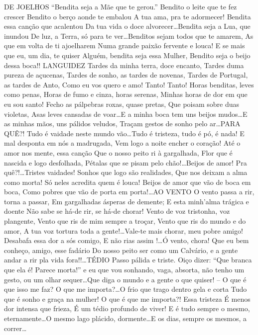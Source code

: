 DE JOELHOS “Bendita seja a Mãe que te gerou.” Bendito o leite que te fez crescer 
Bendito o berço aonde te embalou A tua ama, pra te adormecer! Bendita essa canção que acalentou Da tua vida o doce alvorecer\ldots Bendita seja a Lua, que inundou De luz, a Terra, só para te ver\ldots Benditos sejam todos que te amarem, As que em volta de ti ajoelharem Numa grande paixão fervente e louca! E se mais que eu, um dia, te quiser Alguém, bendita seja essa Mulher, Bendito seja o beijo dessa boca!! LANGUIDEZ Tardes da minha terra, doce encanto, Tardes duma pureza de açucenas, Tardes de sonho, as tardes de novenas, Tardes de Portugal, as tardes de Anto, Como eu vos quero e amo! Tanto! Tanto! Horas benditas, leves como penas, Horas de fumo e cinza, horas serenas, Minhas horas de dor em que eu sou santo! Fecho as pálpebras roxas, quase pretas, Que poisam sobre duas violetas, Asas leves cansadas de voar\ldots E a minha boca tem uns beijos mudos\ldots E as minhas mãos, uns pálidos veludos, Traçam gestos de sonho pelo ar\ldots PARA QUÊ?! Tudo é vaidade neste mundo vão\ldots Tudo é tristeza, tudo é pó, é nada! E mal desponta em nós a madrugada, Vem logo a noite encher o coração! Até o amor nos mente, essa canção Que o nosso peito ri à gargalhada, Flor que é nascida e logo desfolhada, Pétalas que se pisam pelo chão!\ldots Beijos de amor! Pra quê?!\ldots Tristes vaidades! Sonhos que logo são realidades, Que nos deixam a alma como morta! Só neles acredita quem é louca! Beijos de amor que vão de boca em boca, Como pobres que vão de porta em porta!\ldots AO VENTO O vento passa a rir, torna a passar, Em gargalhadas ásperas de demente; E esta minh’alma trágica e doente Não sabe se há-de rir, se há-de chorar! 
Vento de voz tristonha, voz plangente, Vento que ris de mim sempre a troçar, Vento que ris do mundo e do amor, A tua voz tortura toda a gente!\ldots Vale-te mais chorar, meu pobre amigo! Desabafa essa dor a sós comigo, E não rias assim !\ldots Ó vento, chora! Que eu bem conheço, amigo, esse fadário Do nosso peito ser como um Calvário, e a gente andar a rir pla vida fora!!\ldots TÉDIO Passo pálida e triste. Oiço dizer: “Que branca que ela é! Parece morta!” e eu que vou sonhando, vaga, absorta, não tenho um gesto, ou um olhar sequer\ldots Que diga o mundo e a gente o que quiser! – O que é que isso me faz? O que me importa?\ldots O frio que trago dentro gela e corta Tudo que é sonho e graça na mulher! O que é que me importa?! Essa tristeza É menos dor intensa que frieza, É um tédio profundo de viver! E é tudo sempre o mesmo, eternamente\ldots O mesmo lago plácido, dormente\ldots E os dias, sempre os mesmos, a correr\ldots 
